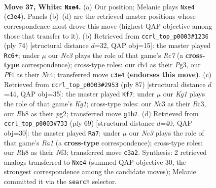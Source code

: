 \documentclass[11pt]{article}
\begin{document}
\clearpage

\begin{figure}[p]\centering
\begin{subfigure}{0.46\textwidth}\centering
\resizebox{\linewidth}{!}{%
\newchessgame
\chessboard[
  setfen={7R/5pp1/4p1k1/1p5p/1r1PbP1P/2N1P1P1/8/6K1 w - - 0 37},
  showmover=false,
  pgfstyle=straightmove, color=movearrow, markmove={c3-e4}
]}
\caption{}
\end{subfigure}\hfill
\begin{subfigure}{0.46\textwidth}\centering
\resizebox{\linewidth}{!}{%
\newchessgame
\chessboard[
  setfen={8/2R1rp2/1p3kp1/p6p/P1Nb3P/1P4P1/5P2/5K2 w - - 3 38},
  showmover=false,
  pgfstyle=straightmove, color=movearrow, markmove={c7-c6}
]}
\caption{}
\end{subfigure}
\\[4pt]
\begin{subfigure}{0.46\textwidth}\centering
\resizebox{\linewidth}{!}{%
\newchessgame
\chessboard[
  setfen={6k1/8/p3p1p1/1p5p/1Pn2K1P/P1r2P2/6P1/2B1R3 b - - 1 44},
  showmover=false,
  pgfstyle=straightmove, color=movearrow, markmove={g8-f7}
]}
\caption{}
\end{subfigure}\hfill
\begin{subfigure}{0.46\textwidth}\centering
\resizebox{\linewidth}{!}{%
\newchessgame
\chessboard[
  setfen={r7/6k1/B2R2p1/5p1p/1p2p2P/5nP1/PP3P2/5K2 b - - 3 35},
  showmover=false,
  pgfstyle=straightmove, color=movearrow, markmove={a8-a7}
]}
\caption{}
\end{subfigure}
\caption{\textbf{Move 37, White: \texttt{Nxe4}.} (a) Our position; Melanie plays \texttt{Nxe4} (\texttt{c3e4}). Panels (b)--(d) are the retrieved master positions whose correspondence most drove this move (highest QAP objective among those that transfer to it). (b) Retrieved from \texttt{ccrl\_top\_p0003\#1236} (ply 74) [structural distance $d$=32, QAP obj=15]: the master played \texttt{Rc6+}; under $\mu$ our \emph{Nc3} plays the role of that game's \emph{Rc7} (a \textbf{cross-type} correspondence); cross-type roles: our \emph{r}b4 as their \emph{P}g3, our \emph{P}f4 as their \emph{N}c4; transferred move \texttt{c3e4} \textbf{(endorses this move)}. (c) Retrieved from \texttt{ccrl\_top\_p0003\#2953} (ply 87) [structural distance $d$=44, QAP obj=35]: the master played \texttt{Kf7}; under $\mu$ our \emph{Kg1} plays the role of that game's \emph{Kg1}; cross-type roles: our \emph{N}c3 as their \emph{R}c3, our \emph{R}h8 as their \emph{p}g2; transferred move \texttt{g1h2}. (d) Retrieved from \texttt{ccrl\_top\_p0003\#733} (ply 69) [structural distance $d$=40, QAP obj=30]: the master played \texttt{Ra7}; under $\mu$ our \emph{Nc3} plays the role of that game's \emph{Ra1} (a \textbf{cross-type} correspondence); cross-type roles: our \emph{R}h8 as their \emph{N}f3; transferred move \texttt{c3a2}. Synthesis: 2 retrieved analogs transferred to \texttt{Nxe4} (summed QAP objective 30, the strongest correspondence among the candidate moves); Melanie committed it via the \texttt{search} selector.}
\label{fig:thought-m72}
\end{figure}
\end{document}
